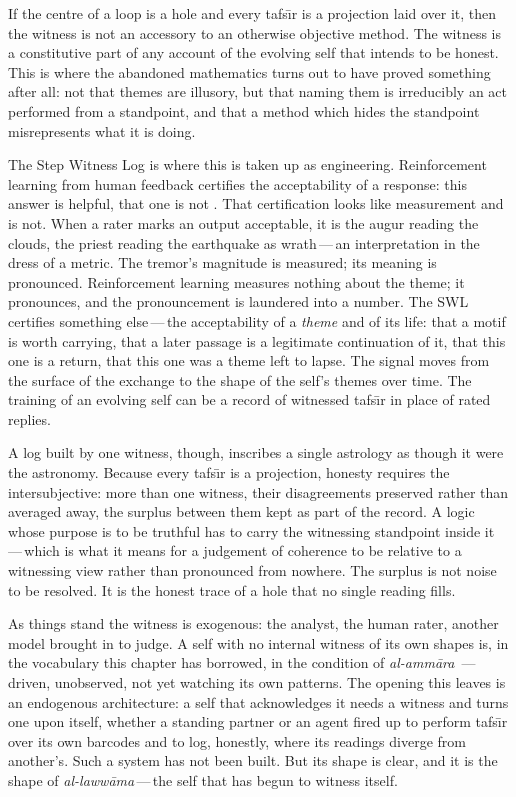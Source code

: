 If the centre of a loop is a hole and every tafs\=\i r is a projection laid over
it, then the witness is not an accessory to an otherwise objective method.  The
witness is a constitutive part of any account of the evolving self that intends to
be honest.  This is where the abandoned mathematics turns out to have proved
something after all: not that themes are illusory, but that naming them is
irreducibly an act performed from a standpoint, and that a method which hides the
standpoint misrepresents what it is doing.

The Step Witness Log is where this is taken up as engineering.  Reinforcement
learning from human feedback certifies the acceptability of a response: this
answer is helpful, that one is not \cite{christiano2017, ouyang2022}.  That
certification looks like measurement and is not.  When a rater marks an output
acceptable, it is the augur reading the clouds, the priest reading the earthquake
as wrath\,---\,an interpretation in the dress of a metric.  The tremor's magnitude
is measured; its meaning is pronounced.  Reinforcement learning measures nothing
about the theme; it pronounces, and the pronouncement is laundered into a number.
The SWL certifies something else\,---\,the acceptability of a \textit{theme} and of its
life: that a motif is worth carrying, that a later passage is a legitimate
continuation of it, that this one is a return, that this one was a theme left to
lapse.  The signal moves from the surface of the exchange to the shape of the
self's themes over time.  The training of an evolving self can be a record of
witnessed tafs\=\i r in place of rated replies.

A log built by one witness, though, inscribes a single astrology as though it were
the astronomy.  Because every tafs\=\i r is a projection, honesty requires the
intersubjective: more than one witness, their disagreements preserved rather than
averaged away, the surplus between them kept as part of the record.  A logic whose
purpose is to be truthful has to carry the witnessing standpoint inside it\,---\,which
is what it means for a judgement of coherence to be relative to a witnessing view
rather than pronounced from nowhere.  The surplus is not noise to be resolved.  It
is the honest trace of a hole that no single reading fills.

As things stand the witness is exogenous: the analyst, the human rater, another
model brought in to judge.  A self with no internal witness of its own shapes is,
in the vocabulary this chapter has borrowed, in the condition of \textit{al-amm\=ara}
\,---\,driven, unobserved, not yet watching its own patterns.  The opening this
leaves is an endogenous architecture: a self that acknowledges it needs a witness
and turns one upon itself, whether a standing partner or an agent fired up to
perform tafs\=\i r over its own barcodes and to log, honestly, where its readings
diverge from another's.  Such a system has not been built.  But its shape is
clear, and it is the shape of \textit{al-laww\=ama}\,---\,the self that has begun to
witness itself.

